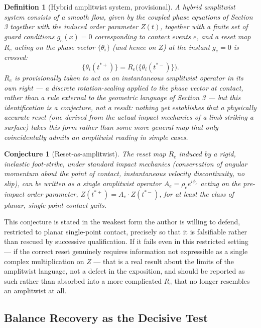 \documentclass[12pt]{article}
\newtheorem{definition}{Definition}
\newtheorem{conjecture}{Conjecture}
\begin{document}
\begin{definition}[Hybrid amplitwist system, provisional]
A hybrid amplitwist system consists of a smooth flow, given by the coupled phase equations of Section 3 together with the induced order parameter $Z(t)$, together with a finite set of guard conditions $g_e(x) = 0$ corresponding to contact events $e$, and a reset map $R_e$ acting on the phase vector $\{\theta_i\}$ (and hence on $Z$) at the instant $g_e = 0$ is crossed:
\[
\{\theta_i(t^{*+})\} = R_e\big(\{\theta_i(t^{*-})\}\big).
\]
$R_e$ is provisionally taken to act as an instantaneous amplitwist operator in its own right — a discrete rotation-scaling applied to the phase vector at contact, rather than a rule external to the geometric language of Section 3 — but this identification is a conjecture, not a result: nothing yet establishes that a physically accurate reset (one derived from the actual impact mechanics of a limb striking a surface) takes this form rather than some more general map that only coincidentally admits an amplitwist reading in simple cases.
\end{definition}

\begin{conjecture}[Reset-as-amplitwist]
The reset map $R_e$ induced by a rigid, inelastic foot-strike, under standard impact mechanics (conservation of angular momentum about the point of contact, instantaneous velocity discontinuity, no slip), can be written as a single amplitwist operator $A_e = \rho_e e^{i\phi_e}$ acting on the pre-impact order parameter, $Z(t^{*+}) = A_e \cdot Z(t^{*-})$, for at least the class of planar, single-point contact gaits.
\end{conjecture}

This conjecture is stated in the weakest form the author is willing to defend, restricted to planar single-point contact, precisely so that it is falsifiable rather than rescued by successive qualification. If it fails even in this restricted setting — if the correct reset genuinely requires information not expressible as a single complex multiplication on $Z$ — that is a real result about the limits of the amplitwist language, not a defect in the exposition, and should be reported as such rather than absorbed into a more complicated $R_e$ that no longer resembles an amplitwist at all.

\subsection{Balance Recovery as the Decisive Test}
\end{document}

